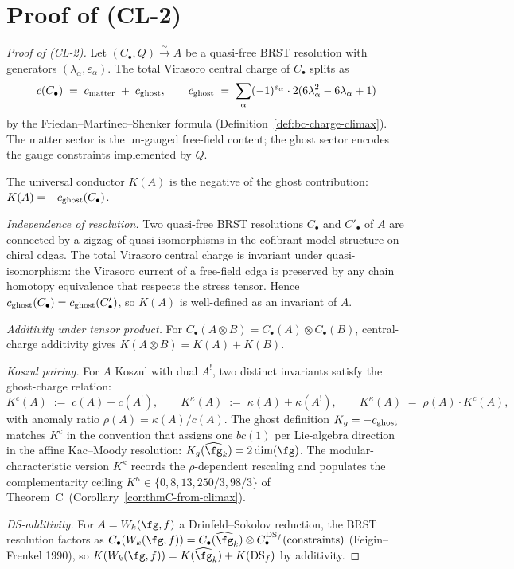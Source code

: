 \section{Proof of (CL-2)}
\label{sec:climax-cl2-proof}

\begin{proof}[Proof of \textup{(CL-2)}]
Let \((C_{\bullet}, Q) \xrightarrow{\sim} A\) be a quasi-free BRST
resolution with generators \((\lambda_{\alpha}, \varepsilon_{\alpha})\).
The total Virasoro central charge of \(C_{\bullet}\) splits as
\[
  c(C_{\bullet})
  \;=\; c_{\mathrm{matter}} \;+\; c_{\mathrm{ghost}},
  \qquad
  c_{\mathrm{ghost}} \;=\; \sum_{\alpha} (-1)^{\varepsilon_{\alpha}} \cdot 2(6\lambda_{\alpha}^{2} - 6\lambda_{\alpha} + 1)
\]
by the Friedan--Martinec--Shenker formula
(Definition~\ref{def:bc-charge-climax}). The matter sector is the
un-gauged free-field content; the ghost sector encodes the gauge
constraints implemented by \(Q\).

The universal conductor \(K(A)\) is the negative of the ghost
contribution: \(K(A) = -c_{\mathrm{ghost}}(C_{\bullet})\).

\smallskip
\emph{Independence of resolution.} Two quasi-free BRST resolutions
\(C_{\bullet}\) and \(C'_{\bullet}\) of \(A\) are connected by a zigzag
of quasi-isomorphisms in the cofibrant model structure on chiral
cdgas. The total Virasoro central charge is invariant under
quasi-isomorphism: the Virasoro current of a free-field cdga is
preserved by any chain homotopy equivalence that respects the stress
tensor. Hence \(c_{\mathrm{ghost}}(C_{\bullet}) = c_{\mathrm{ghost}}(C'_{\bullet})\), so
\(K(A)\) is well-defined as an invariant of \(A\).

\smallskip
\emph{Additivity under tensor product.} For
\(C_{\bullet}(A \otimes B) = C_{\bullet}(A) \otimes C_{\bullet}(B)\),
central-charge additivity gives \(K(A \otimes B) = K(A) + K(B)\).

\smallskip
\emph{Koszul pairing.} For \(A\) Koszul with dual \(A^{!}\), two
distinct invariants satisfy the ghost-charge relation:
\[
  K^{c}(A) \;:=\; c(A) + c(A^{!}),
  \qquad
  K^{\kappa}(A) \;:=\; \kappa(A) + \kappa(A^{!}),
  \qquad
  K^{\kappa}(A) \;=\; \rho(A) \cdot K^{c}(A),
\]
with anomaly ratio \(\rho(A) = \kappa(A)/c(A)\). The ghost
definition \(K_{g} = -c_{\mathrm{ghost}}\) matches \(K^{c}\) in the convention
that assigns one \(bc(1)\) per Lie-algebra direction in the affine
Kac--Moody resolution: \(K_{g}(\widehat{\fg}_{k}) = 2\dim(\fg)\). The
modular-characteristic version \(K^{\kappa}\) records the
\(\rho\)-dependent rescaling and populates the complementarity ceiling
\(K^{\kappa} \in \{0, 8, 13, 250/3, 98/3\}\) of
Theorem~C~(Corollary~\ref{cor:thmC-from-climax}).

\smallskip
\emph{DS-additivity.} For \(A = W_{k}(\fg, f)\) a Drinfeld--Sokolov
reduction, the BRST resolution factors as
\(C_{\bullet}(W_{k}(\fg,f)) = C_{\bullet}(\widehat{\fg}_{k}) \otimes
C_{\bullet}^{\DS_{f}}(\mathrm{constraints})\) (Feigin--Frenkel 1990),
so \(K(W_{k}(\fg,f)) = K(\widehat{\fg}_{k}) + K(\DS_{f})\) by
additivity.
\end{proof}

